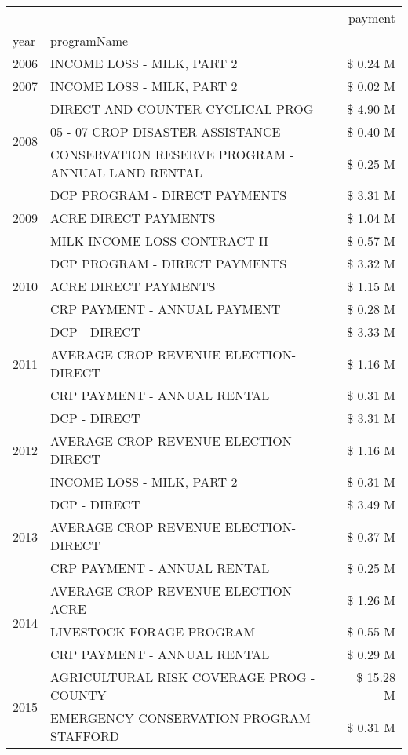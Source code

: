 \begin{tabular}{llr}
\toprule
 &  & payment \\
year & programName &  \\
\midrule
2006 & INCOME LOSS - MILK, PART 2 & \$ 0.24 M \\
\cline{1-3}
2007 & INCOME LOSS - MILK, PART 2 & \$ 0.02 M \\
\cline{1-3}
\multirow[t]{3}{*}{2008} & DIRECT AND COUNTER CYCLICAL PROG & \$ 4.90 M \\
 & 05 - 07 CROP DISASTER ASSISTANCE & \$ 0.40 M \\
 & CONSERVATION RESERVE PROGRAM - ANNUAL LAND RENTAL & \$ 0.25 M \\
\cline{1-3}
\multirow[t]{3}{*}{2009} & DCP PROGRAM - DIRECT PAYMENTS & \$ 3.31 M \\
 & ACRE DIRECT PAYMENTS & \$ 1.04 M \\
 & MILK INCOME LOSS CONTRACT II & \$ 0.57 M \\
\cline{1-3}
\multirow[t]{3}{*}{2010} & DCP PROGRAM - DIRECT PAYMENTS & \$ 3.32 M \\
 & ACRE DIRECT PAYMENTS & \$ 1.15 M \\
 & CRP PAYMENT - ANNUAL PAYMENT & \$ 0.28 M \\
\cline{1-3}
\multirow[t]{3}{*}{2011} & DCP - DIRECT & \$ 3.33 M \\
 & AVERAGE CROP REVENUE ELECTION-DIRECT & \$ 1.16 M \\
 & CRP PAYMENT - ANNUAL RENTAL & \$ 0.31 M \\
\cline{1-3}
\multirow[t]{3}{*}{2012} & DCP - DIRECT & \$ 3.31 M \\
 & AVERAGE CROP REVENUE ELECTION-DIRECT & \$ 1.16 M \\
 & INCOME LOSS - MILK, PART 2 & \$ 0.31 M \\
\cline{1-3}
\multirow[t]{3}{*}{2013} & DCP - DIRECT & \$ 3.49 M \\
 & AVERAGE CROP REVENUE ELECTION-DIRECT & \$ 0.37 M \\
 & CRP PAYMENT - ANNUAL RENTAL & \$ 0.25 M \\
\cline{1-3}
\multirow[t]{3}{*}{2014} & AVERAGE CROP REVENUE ELECTION-ACRE & \$ 1.26 M \\
 & LIVESTOCK FORAGE PROGRAM & \$ 0.55 M \\
 & CRP PAYMENT - ANNUAL RENTAL & \$ 0.29 M \\
\cline{1-3}
\multirow[t]{3}{*}{2015} & AGRICULTURAL RISK COVERAGE PROG - COUNTY & \$ 15.28 M \\
 & EMERGENCY CONSERVATION PROGRAM STAFFORD & \$ 0.31 M \\

\end{tabular}
